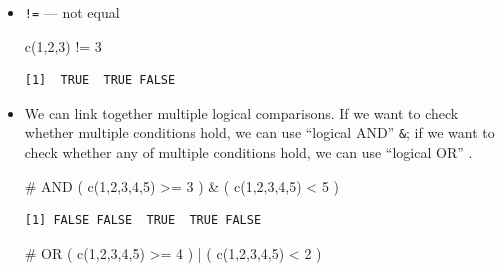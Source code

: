 \documentclass[
  letterpaper,
  DIV=11,
  numbers=noendperiod]{scrreprt}
\newenvironment{Shaded}{\begin{snugshade}}{\end{snugshade}}
\newcommand{\CommentTok}[1]{\textcolor[rgb]{0.37,0.37,0.37}{#1}}
\newcommand{\DecValTok}[1]{\textcolor[rgb]{0.68,0.00,0.00}{#1}}
\newcommand{\FunctionTok}[1]{\textcolor[rgb]{0.28,0.35,0.67}{#1}}
\newcommand{\NormalTok}[1]{\textcolor[rgb]{0.00,0.23,0.31}{#1}}
\newcommand{\SpecialCharTok}[1]{\textcolor[rgb]{0.37,0.37,0.37}{#1}}
\begin{document}
\begin{itemize}
\item
  \texttt{!=} --- not equal

\begin{Shaded}
\begin{Highlighting}[]
\FunctionTok{c}\NormalTok{(}\DecValTok{1}\NormalTok{,}\DecValTok{2}\NormalTok{,}\DecValTok{3}\NormalTok{) }\SpecialCharTok{!=} \DecValTok{3}
\end{Highlighting}
\end{Shaded}

\begin{verbatim}
[1]  TRUE  TRUE FALSE
\end{verbatim}
\item
  We can link together multiple logical comparisons. If we want to check
  whether multiple conditions hold, we can use ``logical AND''
  \texttt{\&}; if we want to check whether any of multiple conditions
  hold, we can use ``logical OR'' \texttt{\textbar{}}.

\begin{Shaded}
\begin{Highlighting}[]
\CommentTok{\# AND}
\NormalTok{( }\FunctionTok{c}\NormalTok{(}\DecValTok{1}\NormalTok{,}\DecValTok{2}\NormalTok{,}\DecValTok{3}\NormalTok{,}\DecValTok{4}\NormalTok{,}\DecValTok{5}\NormalTok{) }\SpecialCharTok{\textgreater{}=} \DecValTok{3}\NormalTok{ ) }\SpecialCharTok{\&}\NormalTok{ ( }\FunctionTok{c}\NormalTok{(}\DecValTok{1}\NormalTok{,}\DecValTok{2}\NormalTok{,}\DecValTok{3}\NormalTok{,}\DecValTok{4}\NormalTok{,}\DecValTok{5}\NormalTok{) }\SpecialCharTok{\textless{}} \DecValTok{5}\NormalTok{ )}
\end{Highlighting}
\end{Shaded}

\begin{verbatim}
[1] FALSE FALSE  TRUE  TRUE FALSE
\end{verbatim}

\begin{Shaded}
\begin{Highlighting}[]
\CommentTok{\# OR}
\NormalTok{( }\FunctionTok{c}\NormalTok{(}\DecValTok{1}\NormalTok{,}\DecValTok{2}\NormalTok{,}\DecValTok{3}\NormalTok{,}\DecValTok{4}\NormalTok{,}\DecValTok{5}\NormalTok{) }\SpecialCharTok{\textgreater{}=} \DecValTok{4}\NormalTok{ ) }\SpecialCharTok{|}\NormalTok{ ( }\FunctionTok{c}\NormalTok{(}\DecValTok{1}\NormalTok{,}\DecValTok{2}\NormalTok{,}\DecValTok{3}\NormalTok{,}\DecValTok{4}\NormalTok{,}\DecValTok{5}\NormalTok{) }\SpecialCharTok{\textless{}} \DecValTok{2}\NormalTok{ )}
\end{Highlighting}
\end{Shaded}


\end{itemize}
\end{document}
